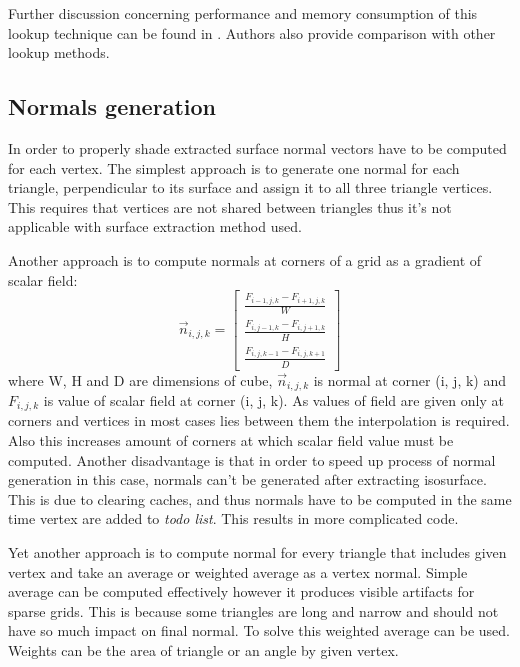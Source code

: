 Further discussion concerning performance and memory consumption of this lookup technique can be found in \cite{RosenbergBirdwell2008}. Authors also provide comparison with other lookup methods. 

\subsection{Normals generation}\label{sec:normals}
In order to properly shade extracted surface normal vectors have to be computed for each vertex. The simplest approach is to generate one normal for each triangle, perpendicular to its surface and assign it to all three triangle vertices. This requires that vertices are not shared between triangles thus it's not applicable with surface extraction method used. 

Another approach is to compute normals at corners of a grid as a gradient of scalar field: 
\begin{equation}
	\vec{n}_{i,j,k} = 
	\begin{bmatrix}
		\frac{F_{i-1, j, k} - F_{i+1, j, k}}{W}\\	
		\frac{F_{i, j-1, k} - F_{i, j+1, k}}{H}\\	
		\frac{F_{i, j, k-1} - F_{i, j, k+1}}{D}
	\end{bmatrix}
\end{equation}
where W, H and D are dimensions of cube, $\vec{n}_{i, j, k}$ is normal at corner (i, j, k) and $F_{i, j, k}$ is value of scalar field at corner (i, j, k).
As values of field are given only at corners and vertices in most cases lies between them the interpolation is required. Also this increases amount of corners at which scalar field value must be computed. Another disadvantage is that in order to speed up process of normal generation in this case, normals can't be generated after extracting isosurface. This is due to clearing caches, and thus normals have to be computed in the same time vertex are added to \textit{todo list}. This results in more complicated code.


Yet another approach is to compute normal for every triangle that includes given vertex and take an average or weighted average as a vertex normal. Simple average can be computed effectively however it produces visible artifacts for sparse grids. This is because some triangles are long and narrow and should not have so much impact on final normal. To solve this weighted average can be used. Weights can be the area of triangle or an angle by given vertex. 

